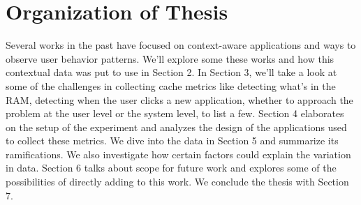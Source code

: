 \documentclass[12pt]{uthesis-v12}  %
\begin{document}
	\section{Organization of Thesis}
		Several works in the past have focused on context-aware applications and ways to observe user behavior patterns. We'll explore some these works and how this contextual data was put to use in Section 2. In Section 3, we'll take a look at some of the challenges in collecting cache metrics like detecting what's in the RAM, detecting when the user clicks a new application, whether to approach the problem at the user level or the system level, to list a few. Section 4 elaborates on the setup of the experiment and analyzes the design of the applications used to collect these metrics. We dive into the data in Section 5 and summarize its ramifications. We also investigate how certain factors could explain the variation in data. Section 6 talks about scope for future work and explores some of the possibilities of directly adding to this work. We conclude the thesis with Section 7.  






\end{document}
